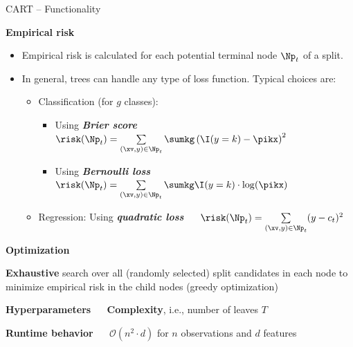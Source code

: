 \documentclass[11pt,compress,t,notes=noshow, xcolor=table]{beamer}
\newcommand{\bfit}[1]{\textbf{\textit{#1}}}
\newcommand{\highlight}[1]{\textcolor{highlightcol}{\textbf{#1}}}
\begin{document}
\begin{frame}{CART -- Functionality}

\footnotesize

\highlight{Empirical risk} \\

\begin{itemize}
  \item Empirical risk is calculated for each potential terminal node $\Np_t$
  of a split.
  \item In general, trees can handle any type of loss function. Typical choices
  are:
  \begin{itemize}
    \footnotesize
    \item Classification (for $g$ classes):
    \begin{itemize}
      \footnotesize
      \item Using \bfit{Brier score} ~~
      $\risk(\Np_t) = \sum\limits_{(\xv,y) \in \Np_t} \sumkg \left( \I(y = k)
      - \pikx \right)^2$
      \item Using \bfit{Bernoulli loss} ~~
      $\risk(\Np_t) = \sum\limits_{(\xv,y) \in \Np_t} \sumkg \I(y = k) \cdot
      \log(\pikx)$
    \end{itemize}
    \item Regression: Using \bfit{quadratic loss} ~~
    $\risk(\Np_t) = \sum\limits_{(\xv,y) \in \Np_t} (y - c_t)^2$
  \end{itemize}
\end{itemize}

\medskip

\highlight{Optimization}

\textbf{Exhaustive} search over all (randomly selected) split candidates in each 
node to minimize empirical risk in the child nodes (greedy optimization)

\medskip

\highlight{Hyperparameters} ~~ \textbf{Complexity}, i.e., 
number of leaves $T$ \\

\medskip

\highlight{Runtime behavior} ~~ $\mathcal{O}(n^2 \cdot d)$ for $n$ 
observations and $d$ features

\normalsize
  
\end{frame}

\end{document}
